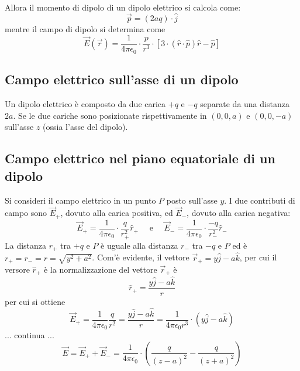 \documentclass[a4paper]{extarticle}
\begin{document}

\vspace{1em}
\noindent
Allora il momento di dipolo di un dipolo elettrico si calcola come:
\[\vec p = (2aq) \cdot \hat{j}\]
mentre il campo di dipolo si determina come
\[\vec{E}(\vec{r}) = \frac{1}{4 \pi \epsilon_0} \cdot \frac{p}{r^3} \cdot \left[3 \cdot (\hat{r} \cdot \hat{p}) \hat{r} - \hat{p}\right]\]

\vspace{1em}
\noindent
\subsection{Campo elettrico sull'asse di un dipolo}
Un dipolo elettrico è composto da due carica $+q$ e $-q$ separate da una distanza $2a$. Se le due cariche sono posizionate rispettivamente in $(0,0,a)$ e $(0,0,-a)$ sull'asse $z$ (ossia l'asse del dipolo).\\

\vspace{1em}
\noindent
\subsection{Campo elettrico nel piano equatoriale di un dipolo}
Si consideri il campo elettrico in un punto $P$ posto sull'asse $y$. I due contributi di campo sono $\vec{E}_+$, dovuto alla carica positiva, ed $\vec{E}_-$, dovuto alla carica negativa:
\[\vec{E}_+ = \frac{1}{4 \pi \epsilon_0} \cdot \frac{q}{r_+^2} \hat{r}_+ \hspace{1em} \text{ e } \hspace{1em} \vec{E}_- = \frac{1}{4 \pi \epsilon_0} \cdot \frac{-q}{r_-^2} \hat{r}_-\]
La distanza $r_+$ tra $+q$ e $P$ è uguale alla distanza $r_-$ tra $-q$ e $P$ ed è $r_+ = r_- = r = \sqrt{y^2+a^2}$. Com'è evidente, il vettore $\vec{r}_+ = y \hat{j} - a \hat{k}$, per cui il versore $\hat{r}_+$ è la normalizzazione del vettore $\vec{r}_+$ è
\[\hat{r}_+=\frac{y \hat{j} - a \hat{k}}{r}\]
per cui si ottiene
\[\vec{E}_+=\frac{1}{4 \pi \epsilon_0} \frac{q}{r^2} = \frac{y \hat{j} - a \hat{k}}{r} = \frac{1}{4 \pi \epsilon_0 r^3} \cdot (y \hat{j} - a \hat{k})\]
... continua ...
\[\vec E = \vec{E}_+ + \vec{E}_- = \frac{1}{4 \pi \epsilon_0} \cdot \left(\frac{q}{(z-a)^2} - \frac{q}{(z+a)^2}\right)\]
\end{document}
